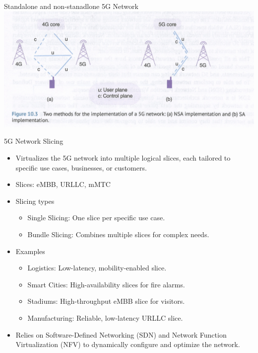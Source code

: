 \documentclass{beamer}
\begin{document}
\begin{frame}{Standalone and non-stanadlone 5G Network}
  \hspace*{0.6em}
  \includegraphics[scale=0.33]{beamer/fig/standalone_and_not.png}
\end{frame}

\begin{frame}{5G Network Slicing}
  \begin{itemize}
    \item Virtualizes the 5G network into multiple logical slices, each tailored to specific use cases, businesses, or customers.
    \item Slices: eMBB, URLLC, mMTC
    \item Slicing types
    \begin{itemize}
        \item Single Slicing: One slice per specific use case.
        \item Bundle Slicing: Combines multiple slices for complex needs.
    \end{itemize}
    \item Examples
    \begin{itemize}
        \item Logistics: Low-latency, mobility-enabled slice.
        \item Smart Cities: High-availability slices for fire alarms.
        \item Stadiums: High-throughput eMBB slice for visitors.
        \item Manufacturing: Reliable, low-latency URLLC slice.
    \end{itemize}
    \item Relies on Software-Defined Networking (SDN) and Network Function Virtualization (NFV) to dynamically configure and optimize the network.
  \end{itemize}
\end{frame}
\end{document}
